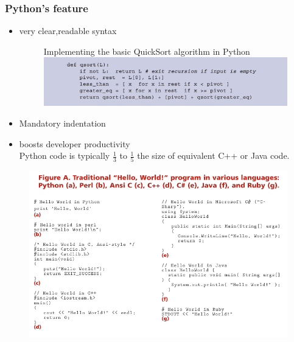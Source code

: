 \documentclass[compress=true]{beamer}
\begin{document}
\begin{frame}
	\frametitle{Python's feature}
	\begin{itemize}
		\item very clear,readable syntax
		\begin{figure}
			\scriptsize{Implementing the basic QuickSort algorithm in Python}
			\includegraphics[height=0.22\textheight]{quick_sort.png}\\
		\end{figure}
	    \item Mandatory indentation
	\end{itemize}
	\begin{itemize}
		\item boosts developer productivity\\
			Python code is typically $\frac{1}{3}$ to $\frac{1}{5}$ the size of
			equivalent C++ or Java code.
	\end{itemize}
\end{frame}
\begin{frame}
	\begin{figure}
		\includegraphics[height=0.7\textheight]{hello_world.png}
	\end{figure}
\end{frame}
\end{document}
